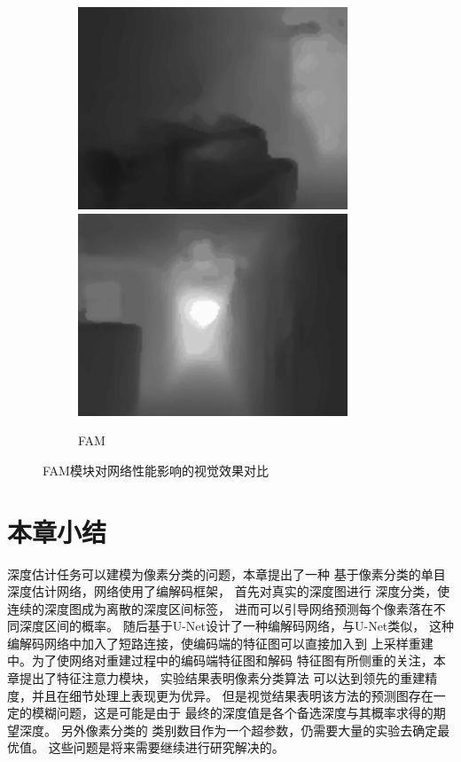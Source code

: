 \begin{figure}[htb]
\begin{subfigure}{0.24\linewidth}
\begin{minipage}[b]{1\linewidth}
  \includegraphics[width=1\linewidth]{figure/FAM/00008_colors.png}\vspace{4pt}
  \includegraphics[width=1\linewidth]{figure/FAM/00014_colors.png}
  \end{minipage}
  \caption{FAM}
  \end{subfigure}
  \caption{FAM模块对网络性能影响的视觉效果对比}
  \label{FAM_visual}
\end{figure}
\section{本章小结}
深度估计任务可以建模为像素分类的问题，本章提出了一种
基于像素分类的单目深度估计网络，网络使用了编解码框架，
首先对真实的深度图进行
深度分类，使连续的深度图成为离散的深度区间标签，
进而可以引导网络预测每个像素落在不同深度区间的概率。
随后基于U-Net设计了一种编解码网络，与U-Net类似，
这种编解码网络中加入了短路连接，使编码端的特征图可以直接加入到
上采样重建中。为了使网络对重建过程中的编码端特征图和解码
特征图有所侧重的关注，本章提出了特征注意力模块，
实验结果表明像素分类算法
可以达到领先的重建精度，并且在细节处理上表现更为优异。
但是视觉结果表明该方法的预测图存在一定的模糊问题，这是可能是由于
最终的深度值是各个备选深度与其概率求得的期望深度。
另外像素分类的
类别数目作为一个超参数，仍需要大量的实验去确定最优值。
这些问题是将来需要继续进行研究解决的。
